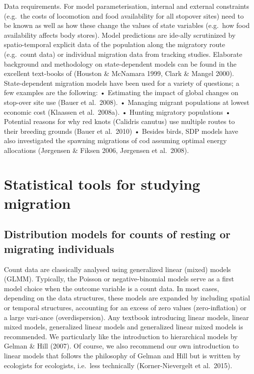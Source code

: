 \documentclass[
]{book}
\begin{document}
Data requirements. For model parameterisation, internal and external constraints (e.g.~the costs of locomotion and food availability for all stopover sites) need to be known as well as how these change the values of state variables (e.g.~how food availability affects body stores). Model predictions are ide-ally scrutinized by spatio-temporal explicit data of the population along the migratory route (e.g.~count data) or individual migration data from tracking studies.
Elaborate background and methodology on state-dependent models can be found in the excellent text-books of (Houston \& McNamara 1999, Clark \& Mangel 2000).
State-dependent migration models have been used for a variety of questions; a few examples are the following:
• Estimating the impact of global changes on stop-over site use (Bauer et al.~2008).
• Managing migrant populations at lowest economic cost (Klaassen et al.~2008a).
• Hunting migratory populations
• Potential reasons for why red knots (Calidris canutus) use multiple routes to their breeding grounds (Bauer et al.~2010)
• Besides birds, SDP models have also investigated the spawning migrations of cod assuming optimal energy allocations (Jørgensen \& Fiksen 2006, Jørgensen et al.~2008).

\hypertarget{statistical-tools-for-studying-migration}{%
\chapter{Statistical tools for studying migration}\label{statistical-tools-for-studying-migration}}

\hypertarget{distribution-models-for-counts-of-resting-or-migrating-individuals}{%
\section{Distribution models for counts of resting or migrating individuals}\label{distribution-models-for-counts-of-resting-or-migrating-individuals}}

Count data are classically analysed using generalized linear (mixed) models (GLMM). Typically, the Poisson or negative-binomial models serve as a first model choice when the outcome variable is a count data. In most cases, depending on the data structures, these models are expanded by including spatial or temporal structures, accounting for an excess of zero values (zero-inflation) or a large vari-ance (overdispersion). Any textbook introducing linear models, linear mixed models, generalized linear models and generalized linear mixed models is recommended. We particularly like the introduction to hierarchical models by Gelman \& Hill (2007). Of course, we also recommend our own introduction to linear models that follows the philosophy of Gelman and Hill but is written by ecologists for ecologists, i.e.~less technically (Korner-Nievergelt et al.~2015).
\end{document}
